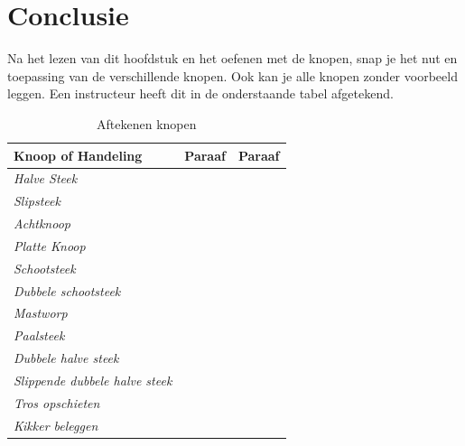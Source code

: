 \section{Conclusie}
Na het lezen van dit hoofdstuk en het oefenen met de knopen, snap je het nut en toepassing van de verschillende knopen. Ook kan je alle knopen zonder voorbeeld leggen. Een instructeur heeft dit in de onderstaande tabel afgetekend.
\vspace{2cm}
\begin{table}[H]
\centering
\caption{Aftekenen knopen}
\label{my-label}
\begin{tabular}{|l|l|l|}
\hline
\textbf{Knoop of Handeling}  & \textbf{Paraaf} & \textbf{Paraaf} \\ \hline
\textit{Halve Steek}         &                 &                 \\ \hline
\textit{Slipsteek}          &                 &                 \\ \hline
\textit{Achtknoop}           &                 &                 \\ \hline
\textit{Platte Knoop}        &                 &                 \\ \hline
\textit{Schootsteek}        &                 &                 \\ \hline
\textit{Dubbele schootsteek}        &                 &                 \\ \hline
\textit{Mastworp}            &                 &                 \\ \hline
\textit{Paalsteek}           &                 &                 \\ \hline
\textit{Dubbele halve steek} &                 &                 \\ \hline
\textit{Slippende dubbele halve steek} &                 &                 \\ \hline
\textit{Tros opschieten}     &                 &                 \\ \hline
\textit{Kikker beleggen}     &                 &                 \\ \hline
\end{tabular}
\end{table}